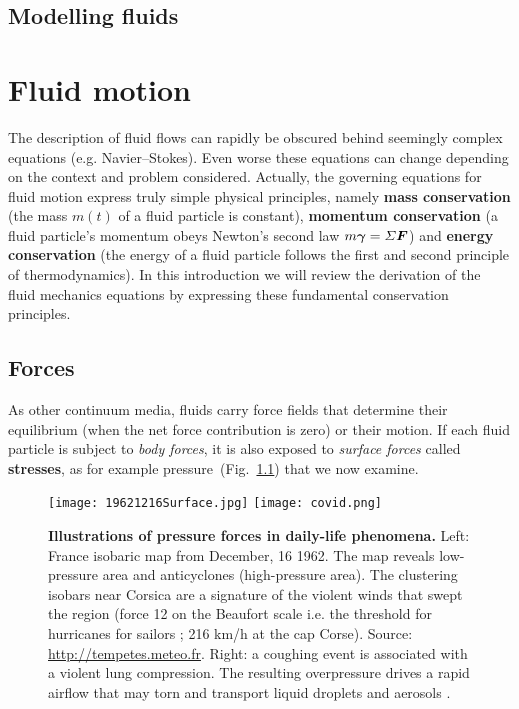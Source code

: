 \newpage
\section*{Modelling fluids}
\chapter{Fluid motion}
\label{chap:fluid-motion}
The description of fluid flows can rapidly be obscured behind seemingly complex equations (e.g. Navier--Stokes). Even worse these equations can change depending on the context and problem considered. Actually, the governing equations for fluid motion express truly simple physical principles, namely \textbf{mass conservation} (the mass $m(t)$ of a fluid particle is constant), \textbf{momentum conservation} (a fluid particle's momentum obeys Newton's second law $m \matrixsym \gamma = \Sigma \bF$) and \textbf{energy conservation} (the energy of a fluid particle follows the first and second principle of thermodynamics).  In this introduction we will review the derivation of the fluid mechanics equations by expressing these fundamental conservation principles.
\section{Forces}
As other continuum media, fluids carry force fields that determine their equilibrium (when the net force contribution is zero) or their motion. If each fluid particle is subject to \textit{body forces}, it is also exposed to \textit{surface forces} called \textbf{stresses}, as for example pressure~(Fig.~\ref{fig:weather_map}) that we now examine.
\begin{figure}[htbp]
\begin{center}
\texttt{[image: 19621216Surface.jpg]}
\texttt{[image: covid.png]}
\caption{\textbf{Illustrations of pressure forces in daily-life phenomena.} Left: France isobaric map from December, 16 1962. The map reveals low-pressure area and anticyclones (high-pressure area). The clustering isobars near Corsica are a signature of the violent winds that swept the region (force 12 on the Beaufort scale i.e. the threshold for hurricanes for sailors ; 216 km/h at the cap Corse). Source: \url{http://tempetes.meteo.fr}. Right: a coughing event is associated with a violent lung compression. The resulting overpressure drives a rapid airflow that may torn and transport liquid droplets and aerosols \citep{Mittal2020}.}
\label{fig:weather_map}
\end{center}
\end{figure}

